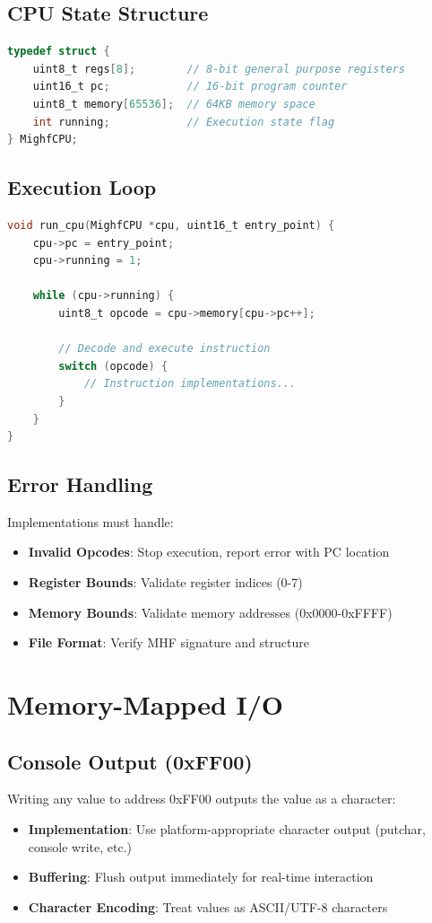 \documentclass[a4paper,12pt]{article}
\begin{document}
\subsection{CPU State Structure}
\begin{lstlisting}[language=C, caption=Reference CPU State]
typedef struct {
    uint8_t regs[8];        // 8-bit general purpose registers
    uint16_t pc;            // 16-bit program counter
    uint8_t memory[65536];  // 64KB memory space
    int running;            // Execution state flag
} MighfCPU;
\end{lstlisting}

\subsection{Execution Loop}
\begin{lstlisting}[language=C, caption=Standard Execution Loop]
void run_cpu(MighfCPU *cpu, uint16_t entry_point) {
    cpu->pc = entry_point;
    cpu->running = 1;
    
    while (cpu->running) {
        uint8_t opcode = cpu->memory[cpu->pc++];
        
        // Decode and execute instruction
        switch (opcode) {
            // Instruction implementations...
        }
    }
}
\end{lstlisting}

\subsection{Error Handling}
Implementations must handle:
\begin{itemize}
    \item \textbf{Invalid Opcodes}: Stop execution, report error with PC location
    \item \textbf{Register Bounds}: Validate register indices (0-7)
    \item \textbf{Memory Bounds}: Validate memory addresses (0x0000-0xFFFF)
    \item \textbf{File Format}: Verify MHF signature and structure
\end{itemize}

\section{Memory-Mapped I/O}

\subsection{Console Output (0xFF00)}
Writing any value to address 0xFF00 outputs the value as a character:
\begin{itemize}
    \item \textbf{Implementation}: Use platform-appropriate character output (putchar, console write, etc.)
    \item \textbf{Buffering}: Flush output immediately for real-time interaction
    \item \textbf{Character Encoding}: Treat values as ASCII/UTF-8 characters
\end{itemize}
\end{document}
